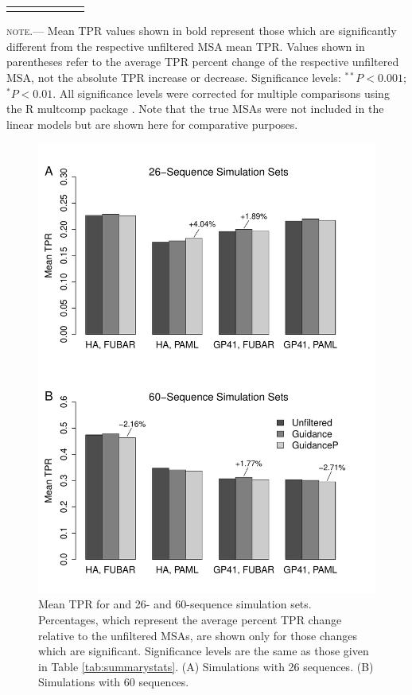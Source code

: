 \documentclass[11pt]{article}
\begin{document}
\begin{table}[htbp]
\begin{adjustwidth}{-0.75cm}{}
\begin{tabular}{l l l c c c c}
\noalign{\smallskip}\hline\noalign{\smallskip}
\end{tabular}
\newline
\textsc{note.}--- Mean TPR values shown in bold represent those which are significantly different from the respective unfiltered MSA mean TPR. Values shown in parentheses refer to the average TPR percent change of the respective unfiltered MSA, not the absolute TPR increase or decrease. Significance levels:  $^{\ast\ast} P < 0.001$; $^{\ast} P < 0.01$. All significance levels were corrected for multiple comparisons using the R multcomp package \citep{Hothorn2008}. Note that the true MSAs were not included in the linear models but are shown here for comparative purposes.
\end{adjustwidth}
\end{table}

\begin{figure}[H]
\centerline{\includegraphics[width=4.75in]{Figures/barplot.pdf}}
\caption{\label{barplot} Mean TPR for and 26- and  60-sequence simulation sets. Percentages, which represent the average percent TPR change relative to the unfiltered MSAs, are shown only for those changes which are significant. Significance levels are the same as those given in Table \ref{tab:summarystats}. (A) Simulations with 26 sequences. (B) Simulations with 60 sequences.}
\end{figure}
\end{document}
